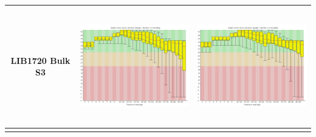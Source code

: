 \begin{center}
\begin{tabular}{ccc}
\begin{sideways}LIB1720 Bulk S3 \end{sideways} & \includegraphics[height=5cm]{Appendices/images/Sample_LIB1720_base_quality_R1.png} & \includegraphics[height=5cm]{Appendices/images/Sample_LIB1720_base_quality_R2.png} \\ \midrule  \\

\end{tabular}
\end{center}



\newpage


